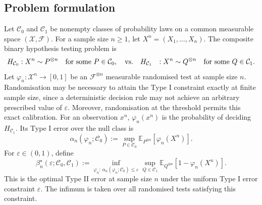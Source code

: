 \documentclass[journal,10pt,draftclsnofoot,onecolumn]{IEEEtran}
\begin{document}
\subsection{Problem formulation}
Let $\mathcal C_0$ and $\mathcal C_1$ be nonempty classes of probability laws on a common measurable space $(\mathcal X,\mathcal F)$. For a sample size $n\geq1$, let $X^n=(X_1,\ldots,X_n)$. The composite binary hypothesis testing problem is
\begin{equation*}
\begin{aligned}
H_{\mathcal C_0} &:X^n\sim P^{\otimes n}\quad\text{for some }P\in\mathcal C_0,\quad {\rm vs.} \quad H_{\mathcal C_1} &:X^n\sim Q^{\otimes n}\quad\text{for some }Q\in\mathcal C_1.
\end{aligned}
\end{equation*}
Let $\varphi_n:\mathcal X^n\to[0,1]$ be an $\mathcal F^{\otimes n}$ measurable randomised test at sample size $n$. Randomisation may be necessary to attain the Type I constraint exactly at finite sample size, since a deterministic decision rule may not achieve an arbitrary prescribed value of $\varepsilon$. Moreover, randomisation at the threshold permits this exact calibration. For an observation $x^n$, $\varphi_n(x^n)$ is the probability of deciding $H_{\mathcal C_1}$. Its Type I error over the null class is
\begin{equation*}
\alpha_n(\varphi_n;\mathcal C_0) :=\sup_{P\in\mathcal C_0}\mathbb E_{P^{\otimes n}} \left[\varphi_n(X^n)\right].
\end{equation*}
For $\varepsilon\in(0,1)$, define
\begin{equation}
\beta_n^\star(\varepsilon;\mathcal C_0,\mathcal C_1):=\inf_{\varphi_n:\,\alpha_n(\varphi_n;\mathcal C_0)\leq\varepsilon} \sup_{Q\in\mathcal C_1} \mathbb E_{Q^{\otimes n}} \left[1-\varphi_n(X^n)\right].
\label{eq:composite-minimax}
\end{equation}
This is the optimal Type II error at sample size $n$ under the uniform Type I error constraint $\varepsilon$. The infimum is taken over all randomised tests satisfying this constraint.

\end{document}
